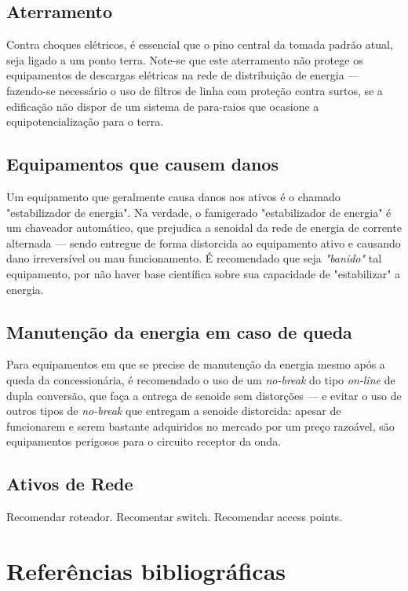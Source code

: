 \documentclass[	DIV=calc,%
							paper=a4,%
							fontsize=12pt,%
							onecolumn]{scrartcl}	 					%
\begin{document}
\subsection{Aterramento}

Contra choques elétricos, é essencial que o pino central da tomada padrão atual, seja ligado a um ponto terra. Note-se que este aterramento não protege os equipamentos de descargas elétricas na rede de distribuição de energia --- fazendo-se necessário o uso de filtros de linha com proteção contra surtos, se a edificação não dispor de um sistema de para-raios que ocasione a equipotencialização para o terra.

\subsection{Equipamentos que causem danos}

Um equipamento que geralmente causa danos aos ativos é o chamado "estabilizador de energia". Na verdade, o famigerado "estabilizador de energia" é um chaveador automático, que prejudica a senoidal da rede de energia de corrente alternada --- sendo entregue de forma distorcida ao equipamento ativo e causando dano irreversível ou mau funcionamento. É recomendado que seja \textit{"banido"} tal equipamento, por não haver base científica sobre sua capacidade de "estabilizar" a energia.

\subsection{Manutenção da energia em caso de queda}

Para equipamentos em que se precise de manutenção da energia mesmo após a queda da concessionária, é recomendado o uso de um \textit{no-break} do tipo \textit{on-line} de dupla conversão, que faça a entrega de senoide sem distorções --- e evitar o uso de outros tipos de \textit{no-break} que entregam a senoide distorcida: apesar de funcionarem e serem bastante adquiridos no mercado por um preço razoável, são equipamentos perigosos para o circuito receptor da onda.


\subsection{Ativos de Rede}

Recomendar roteador.
Recomentar switch.
Recomendar access points.

\pagebreak
\section{Referências bibliográficas}


\renewcommand\refname{} %

  
\end{document}

